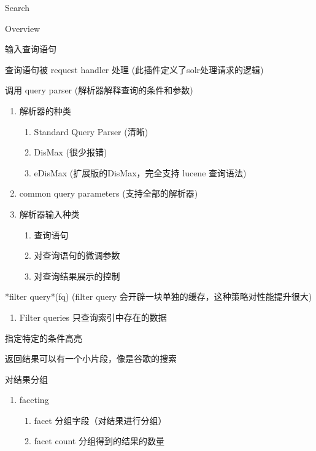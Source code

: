\documentclass[presentation]{beamer}
\begin{document}
\begin{frame}[fragile,label={sec:org1ccf379}]{Search}
 \begin{block}{Overview}
\begin{block}{输入查询语句}
\end{block}
\begin{block}{查询语句被 \alert{request handler} 处理 (此插件定义了solr处理请求的逻辑)}
\end{block}
\begin{block}{调用 \alert{query parser} (解析器解释查询的条件和参数)}
\begin{enumerate}
\item 解析器的种类
\begin{enumerate}
\item Standard Query Parser (清晰)
\item DisMax (很少报错)
\item eDisMax (扩展版的DisMax，完全支持 lucene 查询语法)
\end{enumerate}
\item common query parameters  (支持全部的解析器)
\item 解析器输入种类
\begin{enumerate}
\item 查询语句
\item 对查询语句的微调参数
\item 对查询结果展示的控制
\end{enumerate}
\end{enumerate}
\end{block}
\begin{block}{*filter query*(fq) (filter query 会开辟一块单独的缓存，这种策略对性能提升很大)}
\begin{enumerate}
\item Filter queries 只查询索引中存在的数据
\end{enumerate}
\end{block}
\begin{block}{指定特定的条件高亮}
\end{block}
\begin{block}{返回结果可以有一个小片段，像是谷歌的搜索}
\end{block}
\begin{block}{对结果分组}
\begin{enumerate}
\item faceting
\begin{enumerate}
\item facet 分组字段（对结果进行分组）
\item facet count 分组得到的结果的数量

\end{enumerate}
\end{enumerate}
\end{block}
\end{block}
\end{frame}
\end{document}
